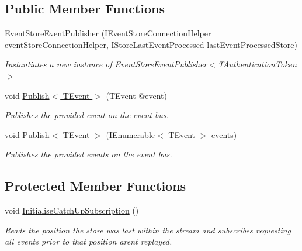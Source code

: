 \subsection*{Public Member Functions}
\begin{DoxyCompactItemize}
\item 
\hyperlink{classCqrs_1_1EventStore_1_1Bus_1_1EventStoreEventPublisher_a4ca16479fe387fae0135865ae3f889d7_a4ca16479fe387fae0135865ae3f889d7}{Event\+Store\+Event\+Publisher} (\hyperlink{interfaceCqrs_1_1EventStore_1_1IEventStoreConnectionHelper}{I\+Event\+Store\+Connection\+Helper} event\+Store\+Connection\+Helper, \hyperlink{interfaceCqrs_1_1Bus_1_1IStoreLastEventProcessed}{I\+Store\+Last\+Event\+Processed} last\+Event\+Processed\+Store)
\begin{DoxyCompactList}\small\item\em Instantiates a new instance of \hyperlink{classCqrs_1_1EventStore_1_1Bus_1_1EventStoreEventPublisher_a4ca16479fe387fae0135865ae3f889d7_a4ca16479fe387fae0135865ae3f889d7}{Event\+Store\+Event\+Publisher$<$\+T\+Authentication\+Token$>$} \end{DoxyCompactList}\item 
void \hyperlink{classCqrs_1_1EventStore_1_1Bus_1_1EventStoreEventPublisher_a1ebb6f08648bdfd5c5bd29fcc12adfea_a1ebb6f08648bdfd5c5bd29fcc12adfea}{Publish$<$ T\+Event $>$} (T\+Event @event)
\begin{DoxyCompactList}\small\item\em Publishes the provided {\itshape event}  on the event bus. \end{DoxyCompactList}\item 
void \hyperlink{classCqrs_1_1EventStore_1_1Bus_1_1EventStoreEventPublisher_a85b4922ff01b088b01b39463681c6eb6_a85b4922ff01b088b01b39463681c6eb6}{Publish$<$ T\+Event $>$} (I\+Enumerable$<$ T\+Event $>$ events)
\begin{DoxyCompactList}\small\item\em Publishes the provided {\itshape events}  on the event bus. \end{DoxyCompactList}\end{DoxyCompactItemize}
\subsection*{Protected Member Functions}
\begin{DoxyCompactItemize}
\item 
void \hyperlink{classCqrs_1_1EventStore_1_1Bus_1_1EventStoreEventPublisher_a145dd61678031747b4c1768e68937181_a145dd61678031747b4c1768e68937181}{Initialise\+Catch\+Up\+Subscription} ()
\begin{DoxyCompactList}\small\item\em Reads the position the store was last within the stream and subscribes requesting all events prior to that position aren\textquotesingle{}t replayed. \end{DoxyCompactList}\end{DoxyCompactItemize}
